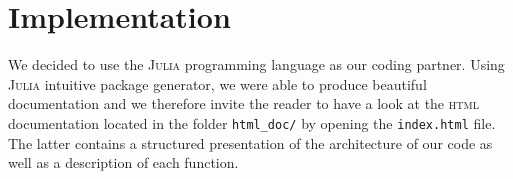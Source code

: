 \section{Implementation} %
\label{sec:implementation}
We decided to use the \textsc{Julia}
programming language as our coding partner.
Using \textsc{Julia} intuitive package generator, we were able to
produce beautiful documentation and we therefore invite
the reader to have a look at the \textsc{html} documentation located
in the folder \texttt{html\_doc/} by opening the \texttt{index.html} file.
The latter contains a structured presentation of the architecture
of our code as well as a description of each function.
